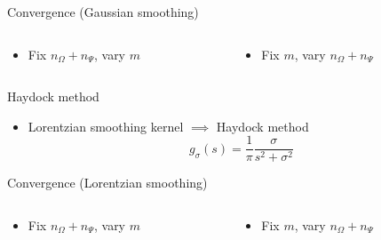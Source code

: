 \documentclass[aspectratio=169, leqno, 12pt]{beamer}
\begin{document}
\begin{frame}{Convergence (Gaussian smoothing)}
    \begin{columns}
        \begin{column}{0.5\textwidth}
            \begin{itemize}
                \item Fix $n_{\Omega} + n_{\Psi}$, vary $m$
            \end{itemize}
            \scalebox{1.0}{}
        \end{column}
        \begin{column}{0.5\textwidth}
            \begin{itemize}
                \item Fix $m$, vary $n_{\Omega} + n_{\Psi}$
            \end{itemize}
            \scalebox{1.0}{}
        \end{column}
    \end{columns}
\end{frame}

\begin{frame}{Haydock method}
    \begin{itemize}
        \item Lorentzian smoothing kernel $\implies$ Haydock method \cite{lin2016review}
    \begin{equation}
        g_{\sigma}(s) = \frac{1}{\pi} \frac{\sigma}{s^2 + \sigma^2}
    \end{equation}
    \end{itemize}
    \centering
    
\end{frame}
 
\begin{frame}{Convergence (Lorentzian smoothing)}
    \begin{columns}
        \begin{column}{0.5\textwidth}
            \begin{itemize}
                \item Fix $n_{\Omega} + n_{\Psi}$, vary $m$
            \end{itemize}
            \scalebox{1.0}{}
        \end{column}
        \begin{column}{0.5\textwidth}
            \begin{itemize}
                \item Fix $m$, vary $n_{\Omega} + n_{\Psi}$
            \end{itemize}
            \scalebox{1.0}{}
        \end{column}
    \end{columns}
\end{frame}
\end{document}
